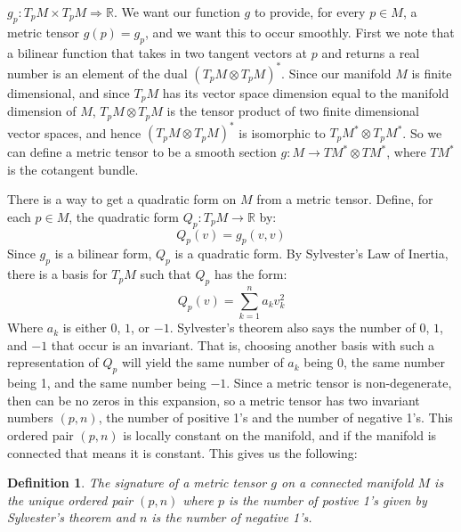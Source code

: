 \documentclass{article}
\theoremstyle{plain}
\theoremstyle{thmit}
\theoremstyle{normal}
\newtheorem{definition}{Definition}[section]
\begin{document}
        $g_{p}:T_{p}M\times{T}_{p}M\Rightarrow\mathbb{R}$. We want our function
        $g$ to provide, for every $p\in{M}$, a metric tensor $g(p)=g_{p}$, and
        we want this to occur smoothly. First we note that a bilinear function
        that takes in two tangent vectors at $p$ and returns a real number is an
        element of the dual $(T_{p}M\otimes{T}_{p}M)^{*}$. Since our manifold
        $M$ is finite dimensional, and since $T_{p}M$ has its vector space
        dimension equal to the manifold dimension of $M$,
        $T_{p}M\otimes{T}_{p}M$ is the tensor product of two finite dimensional
        vector spaces, and hence $(T_{p}M\otimes{T}_{p}M)^{*}$ is isomorphic
        to $T_{p}M^{*}\otimes{T}_{p}M^{*}$. So we can define a metric tensor
        to be a smooth section $g:M\rightarrow{T}M^{*}\otimes{T}M^{*}$, where
        $TM^{*}$ is the cotangent bundle.
        \par\hfill\par
        There is a way to get a quadratic form on $M$ from a metric tensor.
        Define, for each $p\in{M}$, the quadratic form
        $Q_{p}:T_{p}M\rightarrow\mathbb{R}$ by:
        \begin{equation}
            Q_{p}(v)=g_{p}(v,v)
        \end{equation}
        Since $g_{p}$ is a bilinear form, $Q_{p}$ is a quadratic form. By
        Sylvester's Law of Inertia, there is a basis for $T_{p}M$ such that
        $Q_{p}$ has the form:
        \begin{equation}
            Q_{p}(v)=\sum_{k=1}^{n}a_{k}v_{k}^{2}
        \end{equation}
        Where $a_{k}$ is either $0$, $1$, or $-1$. Sylvester's theorem also says
        the number of $0$, $1$, and $-1$ that occur is an invariant. That is,
        choosing another basis with such a representation of $Q_{p}$ will yield
        the same number of $a_{k}$ being 0, the same number being 1, and the
        same number being $-1$. Since a metric tensor is non-degenerate, then
        can be no zeros in this expansion, so a metric tensor has two invariant
        numbers $(p,n)$, the number of positive 1's and the number of negative
        1's. This ordered pair $(p,n)$ is locally constant on the manifold, and
        if the manifold is connected that means it is constant. This gives us
        the following:
        \begin{definition}
            The signature of a metric tensor $g$ on a connected manifold $M$ is
            the unique ordered pair $(p,n)$ where $p$ is the number of postive
            1's given by Sylvester's theorem and $n$ is the number of negative
            1's.
        \end{definition}
\end{document}
